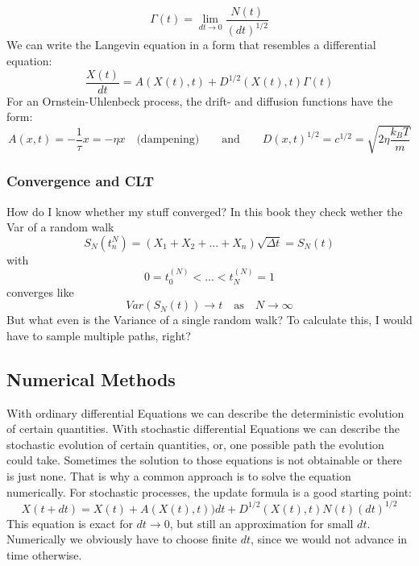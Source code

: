 	\begin{equation}
		\Gamma(t) =	\lim\limits_{dt \rightarrow 0} \frac{N(t)}{(dt)^{1/2}}
	\end{equation}
	We can write the Langevin equation in a form that resembles a differential equation:
	\begin{equation}
		\frac{X(t)}{dt} = A(X(t), t) + D^{1/2}(X(t), t) \Gamma(t)
	\end{equation}
	For an Ornstein-Uhlenbeck process, the drift- and diffusion functions have the form:
	\begin{equation}
		A(x, t) =	- \frac{1}{\tau} x =	-\eta x \quad \text{(dampening)} \qquad \text{and} \qquad D(x,t)^{1/2} =	c^{1/2} =\sqrt{2\eta\frac{k_B T}{m}}
	\end{equation}
	\subsubsection{Convergence and CLT}
	How do I know whether my stuff converged?
	In this book they check wether the Var of a random walk
	\begin{equation}
		S_N(t_n^{N}) =	(X_1 + X_2 + ... + X_n) \sqrt{\Delta t} =	S_N(t)
	\end{equation}
	with
	\begin{equation}
		0 = t_0^{(N)} < ... < t_N^{(N)} =	1
	\end{equation}
	converges like
	\begin{equation}
		Var(S_N(t)) \rightarrow t \quad \text{as} \quad N \rightarrow \infty
	\end{equation}
	But what even is the Variance of a single random walk? To calculate this, I would have to sample multiple paths, right?
	
	\subsection{Numerical Methods}
	With ordinary differential Equations we can describe the deterministic evolution of certain quantities. With stochastic differential Equations we can describe the stochastic evolution of certain quantities, or, one possible path the evolution could take. Sometimes the solution to those equations is not obtainable or there is just none. That is why a common approach is to solve the equation numerically. For stochastic processes, the update formula is a good starting point:
	\begin{equation}
		X(t + dt) =	X(t) + A(X(t), t))dt + D^{1/2}(X(t), t) N(t) (dt)^{1/2}
	\end{equation}
	This equation is exact for $dt \rightarrow 0$, but still an approximation for small $dt$. Numerically we obviously have to choose finite $dt$, since we would not advance in time otherwise.
	
